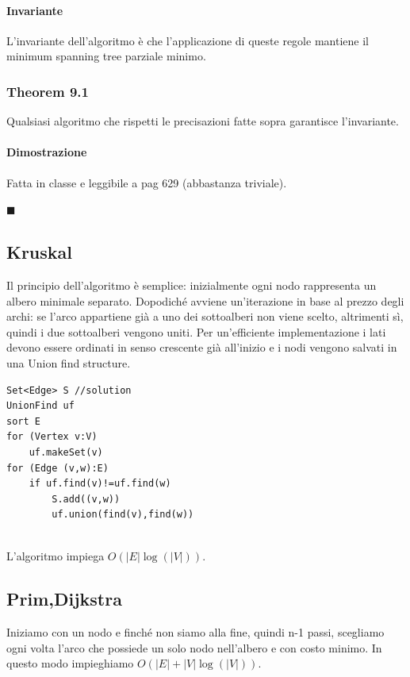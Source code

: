 \documentclass[a4paper]{book}
\newenvironment{mytheorem}[1]{\subsubsection*{Theorem #1}}{\begin{flushright}$\blacksquare$\end{flushright}}
\begin{document}
\paragraph*{Invariante} L'invariante dell'algoritmo è che l'applicazione di queste regole mantiene il minimum spanning tree parziale minimo. 
\begin{mytheorem}{9.1}
Qualsiasi algoritmo che rispetti le precisazioni fatte sopra garantisce l'invariante.
\paragraph*{Dimostrazione} Fatta in classe e leggibile a pag 629 (abbastanza triviale).
\end{mytheorem}
\subsection{Kruskal}
Il principio dell'algoritmo è semplice: inizialmente ogni nodo rappresenta un albero minimale separato. Dopodiché avviene un'iterazione in base al prezzo degli archi: se l'arco appartiene già a uno dei sottoalberi non viene scelto, altrimenti sì, quindi i due sottoalberi vengono uniti. Per un'efficiente implementazione i lati devono essere ordinati in senso crescente già all'inizio e i nodi vengono salvati in una Union find structure. 
\begin{lstlisting}
Set<Edge> S //solution
UnionFind uf
sort E
for (Vertex v:V)
	uf.makeSet(v)
for (Edge (v,w):E)
	if uf.find(v)!=uf.find(w)
		S.add((v,w))
		uf.union(find(v),find(w))
	
\end{lstlisting}
L'algoritmo impiega $O(|E|\log (|V|))$.
\subsection{Prim,Dijkstra}
Iniziamo con un nodo e finché non siamo alla fine, quindi n-1 passi, scegliamo ogni volta l'arco che possiede un solo nodo nell'albero e con costo minimo. In questo modo impieghiamo $O(|E|+|V|\log (|V|))$.
\end{document}
